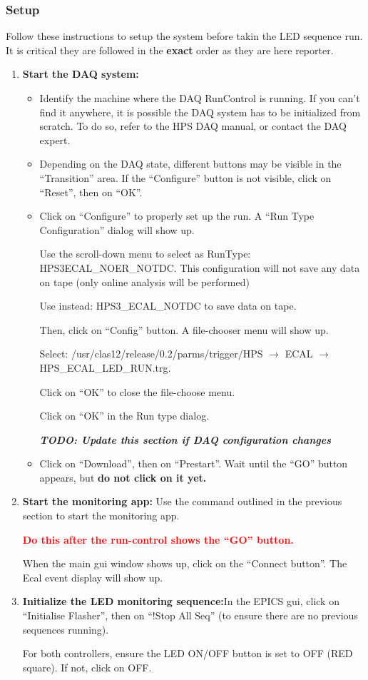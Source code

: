 \documentclass[12pt]{article}
\begin{document}
\subsubsection{Setup}
Follow these instructions to setup the system before takin the LED sequence run.
It is critical they are followed in the \textbf{exact} order as they are here reporter.

\begin{enumerate}
\item{\textbf{Start the DAQ system: }
\begin{itemize}
\item Identify the machine where the DAQ RunControl is running. If you can't find it anywhere, it is possible the DAQ system has to be initialized from scratch. To do so, refer to the HPS DAQ manual, or contact the DAQ expert.
\item Depending on the DAQ state, different buttons may be visible in the ``Transition'' area. If the ``Configure'' button is not visible, click on ``Reset'', then on ``OK''.
\item Click on ``Configure'' to properly set up the run.
A ``Run Type Configuration'' dialog will show up.

Use the scroll-down menu to select as RunType: HPS3ECAL\_NOER\_NOTDC. This configuration will not save any data on tape (only online analysis will be performed)

Use instead: HPS3\_ECAL\_NOTDC to save data on tape.

Then, click on ``Config'' button. A file-chooser menu will show up.

Select: /usr/clas12/release/0.2/parms/trigger/HPS $\rightarrow$ ECAL $\rightarrow$  HPS\_ECAL\_LED\_RUN.trg. 

Click on ``OK'' to close the file-choose menu.

Click on ``OK'' in the Run type dialog.

{\bf \it TODO: Update this section if DAQ configuration changes}

\item{Click on ``Download'', then on ``Prestart''.  Wait until the ``GO'' button appears, but {\bf do not click on it yet.}

 }
\end{itemize}
}
\item{\textbf{Start the monitoring app: }Use the command outlined in the previous section to start the monitoring app.

\textcolor{red}{\bf Do this after the run-control shows the ``GO'' button.}

When the main gui window shows up, click on the ``Connect button''. The Ecal event display will show up.}
\item{\textbf{Initialize the LED monitoring sequence:}In the EPICS gui, click on ``Initialise Flasher'', then on ``!Stop All Seq'' (to ensure there are no previous sequences running). 

For both controllers, ensure the LED ON/OFF button is set to OFF (RED square). If not, click on OFF.}
\end{enumerate}
      
\end{document}
